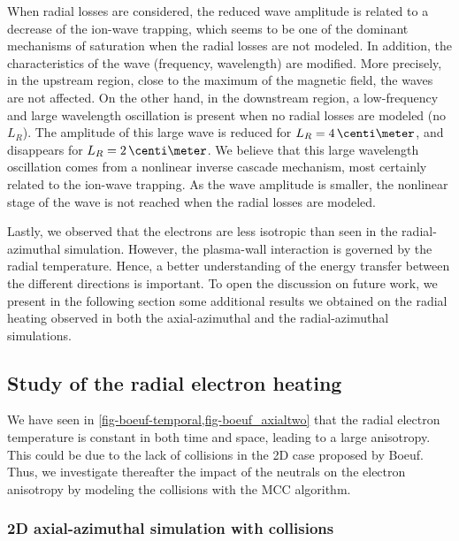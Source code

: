 When radial losses are considered, the reduced wave amplitude is related to a decrease of the ion-wave trapping, which seems to be one of the dominant mechanisms of saturation when the radial losses are not modeled.
In addition, the characteristics of the wave (frequency, wavelength) are modified.
More precisely, in the upstream region, close to the maximum of the magnetic field, the waves are not affected.
On the other hand,  in the downstream region, a low-frequency and large wavelength oscillation is present when no radial losses are modeled (no $L_R$).
The amplitude of this large wave is reduced for $L_R=4\,\centi\meter$, and disappears for $L_R=2\,\centi\meter$.
We believe that this large wavelength oscillation comes from a nonlinear inverse cascade mechanism, most certainly related to the ion-wave trapping.
As the wave amplitude is smaller, the nonlinear stage of the wave is not reached when the radial losses are modeled.


\vspace{1em}
Lastly, we observed that the electrons are less isotropic than seen in the radial-azimuthal simulation.
However, the plasma-wall interaction is governed by the radial temperature.
Hence, a better understanding of the energy transfer between the different directions is important.
To open the discussion on future work, we present in the following section some additional results we obtained on the radial heating observed in both the axial-azimuthal and the radial-azimuthal simulations.


\subsection{Study of the radial electron heating}
\label{sec-rheating}
    We have seen in \cref{fig-boeuf-temporal,fig-boeuf_axialtwo} that the radial electron temperature is constant in both time and space, leading to a large anisotropy.
    This could be due to the lack of collisions in the \ac{2D} \ztheta case proposed by Boeuf.
    Thus, we investigate thereafter the impact of the neutrals on the electron anisotropy by modeling the collisions with the \ac{MCC} algorithm.
    
  \subsubsection{2D axial-azimuthal simulation with collisions} \label{subsec-MCC_boeuf}

